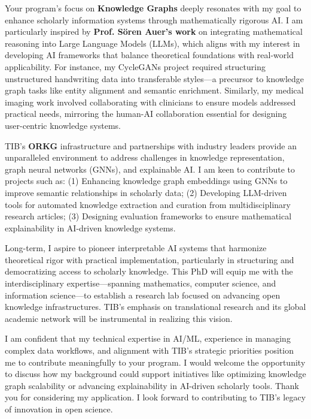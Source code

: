 \documentclass[11pt,a4paper, final]{moderncv}
\begin{document}
Your program's focus on \textbf{Knowledge Graphs} deeply resonates with my goal 
to enhance scholarly information systems through mathematically rigorous AI.  
I am particularly inspired by \textbf{Prof. Sören Auer's work} 
on integrating mathematical reasoning into Large Language Models (LLMs), 
which aligns with my interest in developing AI frameworks that balance theoretical foundations with real-world applicability. 
For instance, my CycleGANs project required structuring unstructured handwriting data into transferable styles—a precursor to knowledge graph tasks like entity alignment and semantic enrichment. Similarly, my medical imaging work involved collaborating with clinicians to ensure models addressed practical needs, mirroring the human-AI collaboration essential for designing user-centric knowledge systems.

TIB's \textbf{ORKG} infrastructure and partnerships with industry leaders 
provide an unparalleled environment to address challenges in knowledge representation, 
graph neural networks (GNNs), and explainable AI. 
I am keen to contribute to projects such as: 
(1) Enhancing knowledge graph embeddings using GNNs to improve semantic relationships in scholarly data; 
(2) Developing LLM-driven tools for automated knowledge extraction and curation from multidisciplinary research articles; 
(3) Designing evaluation frameworks to ensure mathematical explainability in AI-driven knowledge systems.

Long-term, I aspire to pioneer interpretable AI systems that harmonize theoretical rigor with practical implementation, 
particularly in structuring and democratizing access to scholarly knowledge. 
This PhD will equip me with the interdisciplinary expertise—spanning mathematics, computer science, 
and information science—to establish a research lab focused on advancing open knowledge infrastructures. 
TIB's emphasis on translational research and its global academic network will be instrumental in realizing this vision.

I am confident that my technical expertise in AI/ML, experience in managing complex data workflows, 
and alignment with TIB's strategic priorities position me to contribute meaningfully to your program. 
I would welcome the opportunity to discuss how my background could support initiatives like optimizing knowledge graph scalability or advancing explainability in AI-driven scholarly tools. 
Thank you for considering my application. 
I look forward to contributing to TIB's legacy of innovation in open science.

\makeletterclosing
\end{document}
